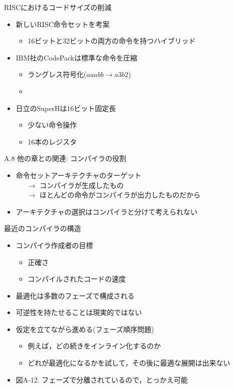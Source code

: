 \documentclass[dvipdfmx]{beamer}
\begin{document}
	\begin{frame}{RISCにおけるコードサイズの削減}
		\begin{itemize}
			\item 新しいRISC命令セットを考案
				\begin{itemize}
					\item 16ビットと32ビットの両方の命令を持つハイブリッド
				\end{itemize}
			\item IBM社のCodePackは標準な命令を圧縮
				\begin{itemize}
					\item ラングレス符号化($aaabb \to a3b2$)
					\item {}
				\end{itemize}
			\item 日立のSuperHは16ビット固定長
				\begin{itemize}
					\item 少ない命令操作
					\item 16本のレジスタ
				\end{itemize}
		\end{itemize}
	\end{frame}

	\begin{frame}{A.8 他の章との関連: コンパイラの役割}
		\begin{itemize}
			\item 命令セットアーキテクチャのターゲット\\ \ \ \ $\to$ コンパイラが生成したもの\\ \ \ \ $\to$ ほとんどの命令がコンパイラが出力したものだから
			\item アーキテクチャの選択はコンパイラと分けて考えられない
		\end{itemize}
	\end{frame}

	\begin{frame}{最近のコンパイラの構造}
		\begin{itemize}
			\item コンパイラ作成者の目標
				\begin{itemize}
					\item 正確さ
					\item コンパイルされたコードの速度
				\end{itemize}
			\item 最適化は多数のフェーズで構成される
			\item 可逆性を持たせることは現実的ではない
			\item 仮定を立てながら進める(フェーズ順序問題)
				\begin{itemize}
					\item 例えば，どの続きをインライン化するのか
					\item どれが最適化になるかを試して，その後に最適な展開は出来ない
				\end{itemize}
			\item 図A-12. フェーズで分離されているので，とっかえ可能
		\end{itemize}
	\end{frame}
\end{document}
